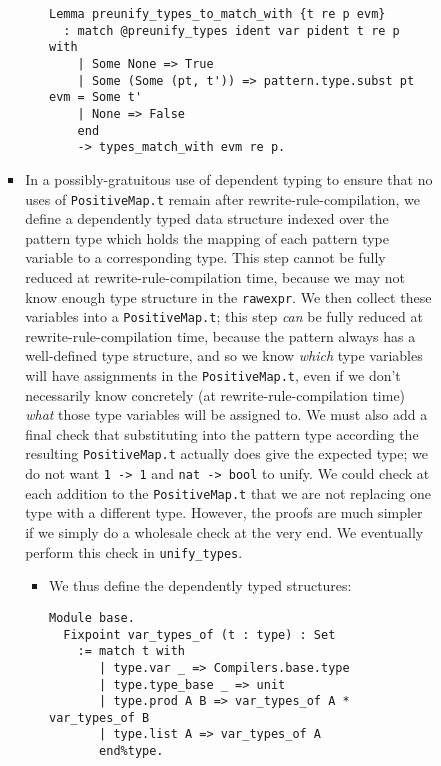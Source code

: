 \begin{itemize}
\begin{itemize}
\begin{itemize}
\begin{itemize}
\begin{itemize}
\begin{verbatim}
Lemma preunify_types_to_match_with {t re p evm}
  : match @preunify_types ident var pident t re p with
    | Some None => True
    | Some (Some (pt, t')) => pattern.type.subst pt evm = Some t'
    | None => False
    end
    -> types_match_with evm re p.
\end{verbatim}
        \end{itemize}
      \item
        In a possibly-gratuitous use of dependent typing to ensure that
        no uses of \texttt{PositiveMap.t} remain after
        rewrite-rule-compilation, we define a dependently typed data
        structure indexed over the pattern type which holds the mapping
        of each pattern type variable to a corresponding type. This step
        cannot be fully reduced at rewrite-rule-compilation time,
        because we may not know enough type structure in the
        \texttt{rawexpr}. We then collect these variables into a
        \texttt{PositiveMap.t}; this step \emph{can} be fully reduced at
        rewrite-rule-compilation time, because the pattern always has a
        well-defined type structure, and so we know \emph{which} type
        variables will have assignments in the \texttt{PositiveMap.t},
        even if we don't necessarily know concretely (at
        rewrite-rule-compilation time) \emph{what} those type variables
        will be assigned to. We must also add a final check that
        substituting into the pattern type according the resulting
        \texttt{PositiveMap.t} actually does give the expected type; we
        do not want
        \texttt{\textquotesingle{}1\ -\textgreater{}\ \textquotesingle{}1}
        and \texttt{nat\ -\textgreater{}\ bool} to unify. We could check
        at each addition to the \texttt{PositiveMap.t} that we are not
        replacing one type with a different type. However, the proofs
        are much simpler if we simply do a wholesale check at the very
        end. We eventually perform this check in \texttt{unify\_types}.

        \begin{itemize}
        \item
          We thus define the dependently typed structures:

\begin{verbatim}
Module base.
  Fixpoint var_types_of (t : type) : Set
    := match t with
       | type.var _ => Compilers.base.type
       | type.type_base _ => unit
       | type.prod A B => var_types_of A * var_types_of B
       | type.list A => var_types_of A
       end%type.


\end{verbatim}
\end{itemize}
\end{itemize}
\end{itemize}
\end{itemize}
\end{itemize}

